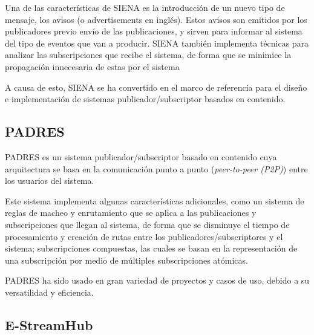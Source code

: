 Una de las características de SIENA es la introducción de un nuevo tipo de mensaje, los avisos (o
advertisements en inglés). Estos avisos son emitidos por los publicadores previo envío de las 
publicaciones, y sirven para informar al sistema del tipo de eventos que van a producir. 
SIENA también implementa técnicas para analizar las subscripciones que recibe el sistema, de forma
que se minimice la propagación innecesaria de estas por el sistema

A causa de esto, SIENA se ha convertido en el marco de referencia para el diseño e implementación
de sistemas publicador/subscriptor basados en contenido.


\subsection{PADRES} \label{ssct:art_sistpubsubcont_padres}

PADRES\cite{paper:padres} es un sistema publicador/subscriptor basado en contenido cuya arquitectura
se basa en la comunicación punto a punto (\textit{peer-to-peer (P2P)}) entre los usuarios del sistema.

Este sistema implementa algunas características adicionales, como un sistema de reglas de macheo y 
enrutamiento que se aplica a las publicaciones y subscripciones que llegan al sistema, de forma que
se disminuye el tiempo de procesamiento y creación de rutas entre los publicadores/subscriptores y 
el sistema; subscripciones compuestas, las cuales se basan en la representación de una subscripción
por medio de múltiples subscripciones
atómicas\cite{paper:padres}\cite{paper:gryphon}\cite{paper:hermes}.

PADRES ha sido usado en gran variedad de proyectos y casos de uso, debido a su versatilidad y
eficiencia\cite{paper:pubsub_mmo}.



\subsection{E-StreamHub} \label{ssct:art_sistpubsubcont_estreamhub}


